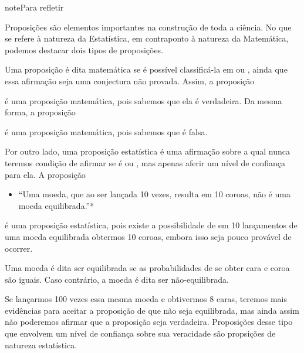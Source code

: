 \begin{sphinxadmonition}{note}{Para refletir}

Proposições são elementos importantes na construção de toda a ciência. No que se refere à natureza da Estatística, em contraponto à natureza da Matemática, podemos destacar dois tipos de proposições.

Uma proposição é dita matemática se é possível classificá-la em  ou , ainda que essa afirmação seja uma conjectura não provada. Assim, a proposição


é uma proposição matemática, pois sabemos que ela é verdadeira. Da mesma forma, a proposição


é uma proposição matemática, pois sabemos que é falsa.

Por outro lado, uma proposição estatística é uma afirmação sobre a qual nunca teremos condição de afirmar se é  ou , mas apenas aferir um nível de confiança para ela. A proposição
\begin{itemize}
\item {} 
``Uma moeda, que ao ser lançada 10 vezes, resulta em 10 coroas, não é uma moeda equilibrada.''*

\end{itemize}

é uma proposição estatística, pois existe a possibilidade de em 10 lançamentos de uma moeda equilibrada obtermos 10 coroas, embora isso seja pouco provável de ocorrer.

 Uma moeda é dita ser equilibrada se as probabilidades de se obter cara e coroa são iguais. Caso contrário, a moeda é dita ser não-equilibrada.

Se lançarmos 100 vezes essa mesma moeda e obtivermos 8 caras, teremos mais evidências para aceitar a proposição de que não seja equilibrada, mas ainda assim não poderemos afirmar que a proposição seja verdadeira. Proposições desse tipo que envolvem um nível de confiança sobre sua veracidade são propsições de natureza estatística.
\end{sphinxadmonition}
\label{\detokenize{PE103-1:sub-classificacao-de-variaveis}}


